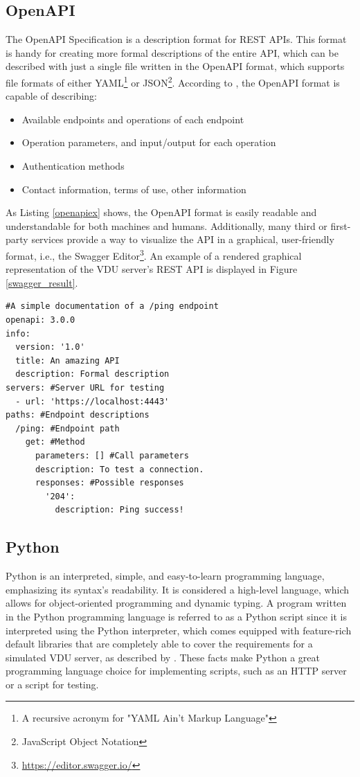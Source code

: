 \subsection{OpenAPI}
The OpenAPI Specification is a description format for REST APIs. This format is handy for creating more formal descriptions of the entire API, which can be described with just a single file written in the OpenAPI format, which supports file formats of either YAML\footnote{A recursive acronym for "YAML Ain't Markup Language"} or JSON\footnote{JavaScript Object Notation}. According to \cite{SwaggerDocs}, the OpenAPI format is capable of describing:

\begin{itemize}
    \item Available endpoints and operations of each endpoint
    \item Operation parameters, and input/output for each operation
    \item Authentication methods
    \item Contact information, terms of use, other information
\end{itemize}

As Listing \ref{openapiex} shows, the OpenAPI format is easily readable and understandable for both machines and humans. Additionally, many third or first-party services provide a way to visualize the API in a graphical, user-friendly format, i.e., the Swagger Editor\footnote{\url{https://editor.swagger.io/}}. An example of a rendered graphical representation of the VDU server's REST API is displayed in Figure \ref{swagger_result}.
\begin{lstlisting}[caption={An example of an OpenAPI file in the YAML format}, label=openapiex]
#A simple documentation of a /ping endpoint
openapi: 3.0.0 
info:
  version: '1.0' 
  title: An amazing API
  description: Formal description
servers: #Server URL for testing
  - url: 'https://localhost:4443'
paths: #Endpoint descriptions
  /ping: #Endpoint path
    get: #Method
      parameters: [] #Call parameters
      description: To test a connection.
      responses: #Possible responses
        '204':
          description: Ping success!
\end{lstlisting}

\subsection{Python}
Python is an interpreted, simple, and easy-to-learn programming language, emphasizing its syntax's readability. It is considered a high-level language, which allows for object-oriented programming and dynamic typing. A program written in the Python programming language is referred to as a Python script since it is interpreted using the Python interpreter, which comes equipped with feature-rich default libraries that are completely able to cover the requirements for a simulated VDU server, as described by \cite{PythonWhatis}. These facts make Python a great programming language choice for implementing scripts, such as an HTTP server or a script for testing.


